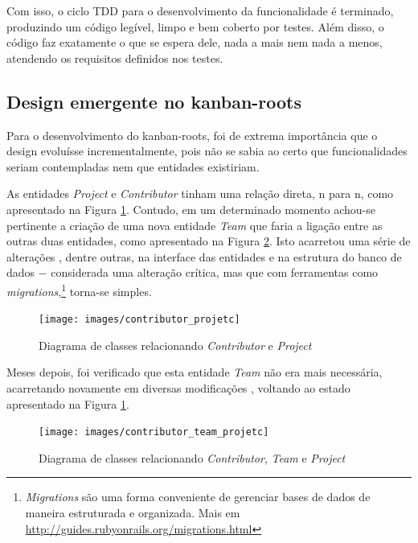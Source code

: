 Com isso, o ciclo TDD para o desenvolvimento da funcionalidade é terminado, produzindo um código legível, limpo e bem coberto por testes. Além disso, o código faz exatamente o que se espera dele, nada a mais nem nada a menos, atendendo os requisitos definidos nos testes.


\subsection{Design emergente no kanban-roots}
\label{sub:design_emergente_no_kanban_roots}

Para o desenvolvimento do kanban-roots, foi de extrema importância que o design evoluísse incrementalmente, pois não se sabia ao certo que
funcionalidades seriam contempladas nem que entidades existiriam.

As entidades \textit{Project} e \textit{Contributor} tinham uma relação direta, n para n, como apresentado na Figura \ref{img:contributor_projetc}. Contudo, em um determinado momento achou-se pertinente a criação de uma nova entidade \textit{Team} que faria a ligação entre as outras duas entidades, como apresentado na Figura \ref{img:contributor_team_projetc}. Isto acarretou uma série de alterações \cite{CommitAddTeam}, dentre outras, na interface das entidades e na estrutura do banco de dados $-$ considerada uma alteração crítica, mas que com ferramentas como \textit{migrations},\footnote{\textit{Migrations} são uma forma conveniente de gerenciar bases de dados de maneira estruturada e organizada. Mais em \url{http://guides.rubyonrails.org/migrations.html}} torna-se simples.

\begin{figure}[h]
  \center
  \caption{Diagrama de classes relacionando \textit{Contributor} e \textit{Project}}
  \texttt{[image: images/contributor\_projetc]}
  \label{img:contributor_projetc}
\end{figure}

Meses depois, foi verificado que esta entidade \textit{Team} não era mais necessária, acarretando novamente em diversas modificações \cite{CommitRemoveTeam}, voltando ao estado apresentado na Figura \ref{img:contributor_projetc}.

\begin{figure}[h]
  \center
  \caption{Diagrama de classes relacionando \textit{Contributor}, \textit{Team} e \textit{Project}}
  \texttt{[image: images/contributor\_team\_projetc]}
  \label{img:contributor_team_projetc}
\end{figure}

